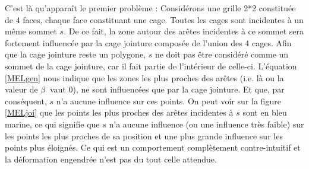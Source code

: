 C'est là qu'apparaît le premier problème : Considérons une grille 2*2
constituée de 4 faces, chaque face constituant une cage. Toutes les
cages sont incidentes à un même sommet $s$. De ce fait, la zone autour
des arêtes incidentes à ce sommet sera fortement influencée par la
cage jointure composée de l'union des 4 cages. Afin que la cage
jointure reste un polygone, $s$ ne doit pas être considéré comme un
sommet de la cage jointure, car il fait partie de l'intérieur de
celle-ci. L'équation \ref{MELgen} nous indique que les zones les plus
proches des arêtes (i.e. là ou la valeur de $\beta~$ vaut 0), ne sont
influencées que par la cage jointure. Et que, par conséquent, $s$ n'a
aucune influence sur ces points. On peut voir sur la figure
\ref{MELjoi} que les points les plus proches des arêtes incidentes à
$s$ sont en bleu marine, ce qui signifie que $s$ n'a aucune influence
(ou une influence très faible) sur les points les plus proches de sa
position et une plus grande influence sur les points plus éloignés. Ce
qui est un comportement complètement contre-intuitif et la déformation
engendrée n'est pas du tout celle attendue.


